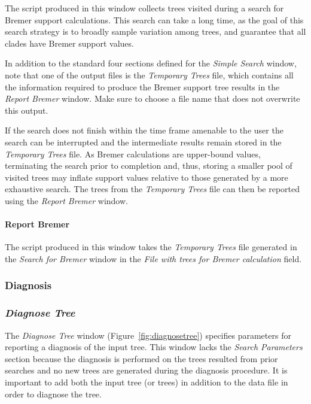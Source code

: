 {The script produced in this window collects trees visited during a search for Bremer support calculations. This
search can take a long time, as the goal of this search strategy is to broadly sample variation among trees, and guarantee that all
clades have Bremer support values. 

In addition to the standard four sections defined for the \emph{Simple Search} window,
note that one of the output files is the \emph{Temporary Trees} file, which 
contains all the information required to produce the Bremer support tree
results in the \emph{Report Bremer} window. Make sure to choose a file name that does not overwrite this output.

If the search does not finish within the time frame amenable to the user the search can be interrupted and the 
intermediate results remain stored in the \emph{Temporary Trees} file.  As Bremer calculations are upper-bound 
values, terminating the search prior to completion and, thus, storing a smaller pool of visited trees may inflate 
support values relative to those generated by a more exhaustive search. The trees from the \emph{Temporary Trees} 
file can then be reported using the \emph{Report Bremer} window.

\paragraph{Report Bremer}
The script produced in this window takes the \emph{Temporary Trees} file generated in the \emph{Search for Bremer} 
window in the \emph{File with trees for Bremer calculation} field. 

\subsubsection{Diagnosis}

\subsubsection*{\emph{Diagnose Tree}}

The \emph{Diagnose Tree} window (Figure~\ref{fig:diagnosetree}) specifies parameters for reporting a diagnosis 
of the input tree. This window lacks the \emph{Search Parameters} section because the diagnosis is performed on 
the trees resulted from prior searches and no new trees are generated during the diagnosis procedure. It is important 
to add both the input tree (or trees) in addition to the data file in order to diagnose the tree.

}

